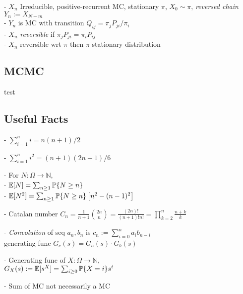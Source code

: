 \documentclass[10pt]{article}
\DeclarePairedDelimiter{\set}{\lbrace}{\rbrace}
\newcommand{\E}{\mathbb{E}}
\newcommand{\N}{\mathbb{N}}
\renewcommand{\P}{\mathbb{P}}
\begin{document}
\begin{multicols}{3}
- $X_n$ Irreducible, positive-recurrent MC, stationary $\pi$, $X_0\sim \pi$,
\emph{reversed chain} $Y_n := X_{N-m}$ \\
- $Y_n$ is MC with transition $Q_{ij} = \pi_j P_{ji} / \pi_i$ \\
- $X_n$ \emph{reversible} if $\pi_j P_{ji} = \pi_i P_{ij}$ \\
- $X_n$ reversible wrt $\pi$ then $\pi$ stationary distribution

\subsection*{MCMC}
test

\subsection*{Useful Facts}
- $\sum_{i=1}^n i = n(n+1)/2$

- $\sum_{i=1}^n i^2 = (n+1)(2n+1)/6$

- For $N:\Omega\to \N$, \\
- $\E[N] = \sum_{n\geq 1} \P\set{N\geq n}$\\
- $\E[N^2] = \sum_{n\geq 1} \P\set{N\geq n} \left[ n^2 - (n-1)^2 \right]$

- Catalan number
$C_n = \frac1{n+1}\binom{2n}{n} = \frac{(2n)!}{(n+1)! n!} = \prod_{k=2}^n \frac{n+k}k$

- \emph{Convolution} of seq $a_n, b_n$ is
$c_n := \sum_{i=0}^n a_i b_{n-i}$ \\
generating func $G_c(s) = G_a(s)\cdot G_b(s)$

- Generating func of $X:\Omega\to \N$, \\
$G_X(s) := \E[s^X] =\sum_{i\geq 0} \P\set{X=i} s^i$

- Sum of MC not necessarily a MC
\end{multicols}
\end{document}
